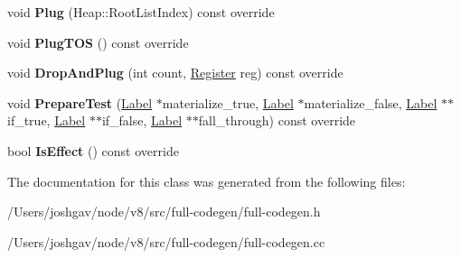 \begin{DoxyCompactItemize}
\item 
void {\bfseries Plug} (Heap\+::\+Root\+List\+Index) const  override\hypertarget{classv8_1_1internal_1_1_full_code_generator_1_1_effect_context_a9103fde321a5add3cd1b4f1f121dd8e2}{}\label{classv8_1_1internal_1_1_full_code_generator_1_1_effect_context_a9103fde321a5add3cd1b4f1f121dd8e2}

\item 
void {\bfseries Plug\+T\+OS} () const  override\hypertarget{classv8_1_1internal_1_1_full_code_generator_1_1_effect_context_a326c47930367083f3fbe9c429b484902}{}\label{classv8_1_1internal_1_1_full_code_generator_1_1_effect_context_a326c47930367083f3fbe9c429b484902}

\item 
void {\bfseries Drop\+And\+Plug} (int count, \hyperlink{structv8_1_1internal_1_1_register}{Register} reg) const  override\hypertarget{classv8_1_1internal_1_1_full_code_generator_1_1_effect_context_a31494a515ebe7bfbf32aaa5b82d4f51c}{}\label{classv8_1_1internal_1_1_full_code_generator_1_1_effect_context_a31494a515ebe7bfbf32aaa5b82d4f51c}

\item 
void {\bfseries Prepare\+Test} (\hyperlink{classv8_1_1internal_1_1_label}{Label} $\ast$materialize\+\_\+true, \hyperlink{classv8_1_1internal_1_1_label}{Label} $\ast$materialize\+\_\+false, \hyperlink{classv8_1_1internal_1_1_label}{Label} $\ast$$\ast$if\+\_\+true, \hyperlink{classv8_1_1internal_1_1_label}{Label} $\ast$$\ast$if\+\_\+false, \hyperlink{classv8_1_1internal_1_1_label}{Label} $\ast$$\ast$fall\+\_\+through) const  override\hypertarget{classv8_1_1internal_1_1_full_code_generator_1_1_effect_context_aa64899b9a01bbafa1e83c47b5fa558ff}{}\label{classv8_1_1internal_1_1_full_code_generator_1_1_effect_context_aa64899b9a01bbafa1e83c47b5fa558ff}

\item 
bool {\bfseries Is\+Effect} () const  override\hypertarget{classv8_1_1internal_1_1_full_code_generator_1_1_effect_context_a5633edcd104d7e3424a1b6b34f2dd5fb}{}\label{classv8_1_1internal_1_1_full_code_generator_1_1_effect_context_a5633edcd104d7e3424a1b6b34f2dd5fb}

\end{DoxyCompactItemize}


The documentation for this class was generated from the following files\+:\begin{DoxyCompactItemize}
\item 
/\+Users/joshgav/node/v8/src/full-\/codegen/full-\/codegen.\+h\item 
/\+Users/joshgav/node/v8/src/full-\/codegen/full-\/codegen.\+cc\end{DoxyCompactItemize}
